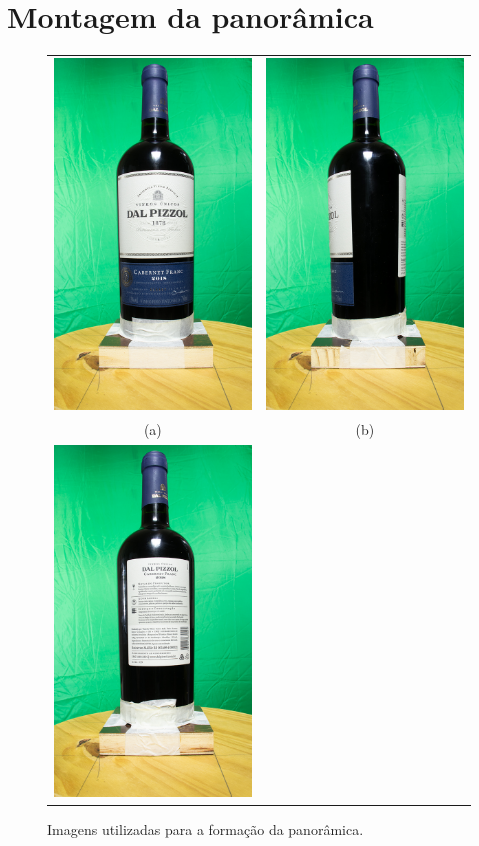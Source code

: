 \annex
\chapter{\hspace{1.2cm}Montagem da panorâmica}

\begin{figure}[ht]
    \caption{Imagens utilizadas para a formação da panorâmica.}     
    \centering
    \vspace{0.3cm}
    \begin{minipage}{.9\textwidth}
      \centering
      \begin{tabular}{cc}
            \includegraphics[width=.3\textwidth]{TCC/Imagens/ensaios/0.jpg} 
            &
            \includegraphics[width=.3\textwidth]{TCC/Imagens/ensaios/90.jpg} \\
            (a) & (b)\\
            \includegraphics[width=.3\textwidth]{TCC/Imagens/ensaios/180.jpg} 

\end{tabular}
\end{minipage}
\end{figure}
